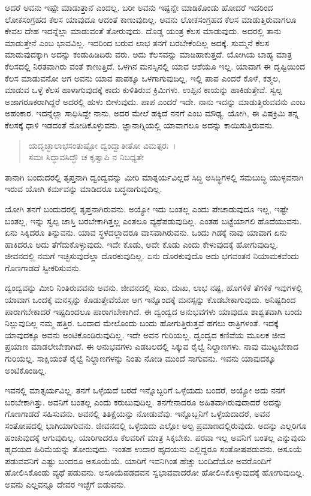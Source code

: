 ಆದರೆ ಅವನು ಇಷ್ಟೇ ಮಾಡುತ್ತಾನೆ ಎಂದಲ್ಲ. ಬರೀ ಅವನು ಇಷ್ಟನ್ನೇ ಮಾಡಿಕೊಂಡು ಹೋದರೆ ಇದರಿಂದ ಲೋಕಸಂಗ್ರಹದ ಕೆಲಸ ಯಾವುದೂ ಆದಂತೆ ಕಾಣುವುದಿಲ್ಲ. ಅವನು ಲೋಕಸಂಗ್ರಹದ ಕೆಲಸ ಮಾಡುತ್ತಿರುವಾಗಲೂ ಕೇವಲ ದೇಹ ಇದನ್ನೆಲ್ಲಾ ಮಾಡುವಂತೆ ತೋರುವುದು. ದೊಡ್ಡ ಯಂತ್ರ ಕೆಲಸ ಮಾಡುವುದು. ಅದರಲ್ಲಿ ತಾನು ಮಾಡುತ್ತೇನೆ ಎಂಬ ಭಾವವಿಲ್ಲ. ಇದರಿಂದ ಬರುವ ಲಾಭ ತನಗೆ ಬರಬೇಕೆಂದಿಲ್ಲ ಅದಕ್ಕೆ. ಸುಮ್ಮನೆ ಕೆಲಸ ಮಾಡುವುದಕ್ಕಾಗಿ ಅದನ್ನು ಕಂಡುಹಿಡಿದಿರು ವರು. ಅದು ಕೆಲಸವನ್ನು ಮಾಡಿಹಾಕುತ್ತದೆ. ಯೋಗಿಯ ಬಾಹ್ಯ ಮಾತ್ರ ಕೆಲಸದಲ್ಲಿ ನಿರತವಾಗಿರು ವಂತೆ ಕಾಣುತ್ತಿದೆ. ಒಳಗಿನ ಮನಸ್ಸಿನಲ್ಲಿ ಯಾವ ಆಶೆಯೂ ಇಲ್ಲ. ಯಾವಾಗ ಈ ದೃಷ್ಟಿಯಿಂದ ಕೆಲಸ ಮಾಡುವನೋ ಆಗ ಅವನು ಯಾವ ಪಾಪಕ್ಕೂ ಒಳಗಾಗುವುದಿಲ್ಲ. ಇಲ್ಲಿ ಪಾಪ ಎಂದರೆ ಕೊಳೆ, ಕಶ್ಮಲ, ಮಾಡುವ ಒಳ್ಳೆ ಕೆಲಸ ಹಾಳಾಗುವುದಕ್ಕೆ ಕಾದು ಕುಳಿತಿರುವ ಕ್ರಿಮಿಗಳು. ಉಪ್ಪಿನ ಕಾಯನ್ನು ಹಾಕಿಡುತ್ತೇವೆ. ಸ್ವಲ್ಪ ಅಜಾಗರೂಕರಾಗಿದ್ದರೆ ಅದರಲ್ಲಿ ಹುಳು ಬೀಳುವುದು. ಪಾಪ ಎಂದರೆ ಇದೇ. ನಾನು ಇದನ್ನು ಮಾಡುತ್ತಿರುವವನು ಎಂಬ ಅಹಂಕಾರ. ಇದನ್ನೆಲ್ಲಾ ಸಾಧಿಸಿದ್ದೇ ನಾನು, ಅದರ ಮೇಲೆ ಹಕ್ಕಿದೆ ನನಗೆ ಎಂಬ ಮೌಢ್ಯ. ಯೋಗಿ, ಈ ವಿಷಕ್ರಿಮಿ ತನ್ನ ಕೆಲಸಕ್ಕೆ ಧಾಳಿ ಇಡದಂತೆ ನೋಡಿಕೊಳ್ಳುವನು. ಜ್ಞಾನಾಗ್ನಿಯಲ್ಲಿ ಯಾವಾಗಲೂ ಅದನ್ನು ಕಾಯಿಸುತ್ತಿರುವನು.

\begin{verse}
ಯದೃಚ್ಛಾಲಾಭಸಂತುಷ್ಟೋ ದ್ವಂದ್ವಾತೀತೋ ವಿಮತ್ಸರಃ~।\\ಸಮಃ ಸಿದ್ಧಾವಸಿದ್ಧೌ ಚ ಕೃತ್ವಾಪಿ ನ ನಿಬಧ್ಯತೇ 
\end{verse}

{\small ತಾನಾಗಿ ಬಂದುದರಲ್ಲಿ ತೃಪ್ತನಾಗಿ ದ್ವಂದ್ವವನ್ನು ಮೀರಿ ಮಾತ್ಸರ್ಯವಿಲ್ಲದೆ ಸಿದ್ಧಿ ಅಸಿದ್ಧಿಗಳಲ್ಲಿ ಸಮಬುದ್ಧಿ ಯುಳ್ಳವನಾಗಿ ಇರುವ ಯೋಗಿ ಕರ್ಮವನ್ನು ಮಾಡಿದರೂ ಬದ್ಧನಾಗುವುದಿಲ್ಲ.}

ಯೋಗಿ ತನಗೆ ಬಂದುದರಲ್ಲಿ ತೃಪ್ತನಾಗಿರುವನು. ಅಯ್ಯೋ ಇದು ಬಂತಲ್ಲ ಎಂದು ಪೇಚಾಡುವುದೂ ಇಲ್ಲ, ಇಷ್ಟೇ ಬಂತಲ್ಲ, ಇನ್ನು ಸ್ವಲ್ಪ ಜಾಸ್ತಿ ಬರಬೇಕಾಗಿತ್ತಲ್ಲ ಎಂತಲೂ ವ್ಯಥೆಪಡುವುದಿಲ್ಲ. ಎಂತಹ ಬಟ್ಟೆಯಾಗಲಿ ಹೊದೆಯುವನು. ಏನು ಸಿಕ್ಕಿದರೂ ತಿನ್ನುವನು. ಯಾವ ಸ್ಥಳದಲ್ಲಾದರೂ ವಾಸವಾಗಿರುವನು. ಒಂದು ಗಿಡಕ್ಕೆ ನಾವು ಯಾವಾಗ ಏನು ಹಾಕಿದರೂ ಅದು ತೆಗೆದುಕೊಳ್ಳುವುದು. ಇದೇ ಕೊಡು, ಅದೇ ಕೊಡು ಎಂದು ಕೇಳುವುದಕ್ಕೆ ಹೋಗುವುದಿಲ್ಲ. ಜೀವನದಲ್ಲಿ ನಮಗೆ ಇಚ್ಛಿಸುವುದೆಲ್ಲಾ ದೊರಕುವುದಿಲ್ಲ. ಏನು ದೊರಕುವುದೊ ಅದು ಭಗವಂತನ ನಿಯಾಮಕವೆಂದು ಗೊಣಗಾಡದೆ ಸ್ವೀಕರಿಸುವನು.

ದ್ವಂದ್ವವನ್ನು ಮೀರಿ ನಿಂತಿರುವವನು ಅವನು. ಜೀವನದಲ್ಲಿ ಸುಖ, ದುಃಖ, ಲಾಭ ನಷ್ಟ, ಹೊಗಳಿಕೆ ತೆಗಳಿಕೆ ಇವುಗಳಲ್ಲಿ ಯಾವಾಗ ಒಂದಕ್ಕೆ ಮನಸ್ಸನ್ನು ಕೊಡುತ್ತೇವೆಯೋ ಆಗ ಇನ್ನೊಂದಕ್ಕೆ ಮನಸ್ಸನ್ನು ಕೊಡಬೇಕಾಗುವುದು. ಅನಿಷ್ಟದಿಂದ ಪಾರಾಗಬೇಕಾದರೆ ಇಷ್ಟದಿಂದಲೂ ಪಾರಾಗಬೇಕಾಗಿದೆ. ಈ ದ್ವಂದ್ವದ ಅನುಭವಗಳು ಯಾವುದೂ ಶಾಶ್ವತವಾಗಿ ಬಂದು ನಿಲ್ಲುವುದಿಲ್ಲ ನಮ್ಮ ಹತ್ತಿರ. ಒಂದಾದ ಮೇಲೊಂದು ಬಂದು ಹೋಗುತ್ತಿರುತ್ತವೆ ಹಗಲು ರಾತ್ರಿಗಳಂತೆ. ಇದಕ್ಕೆ ಯಾವುದಕ್ಕೂ ಅವನು ಅಂಟಿಕೊಂಡಿರುವುದಿಲ್ಲ. ಇದೇ ಅವನ ಗುರಿಯಲ್ಲ. ದ್ವಂದ್ವದ ಕಣಿವೆಯ ಮೂಲಕ ಜೀವ ಪ್ರಯಾಣ ಮಾಡಲೇಬೇಕಾಗಿದೆ. ಈ ಅನುಭವಗಳು ಎಡಬಲದಲ್ಲಿ ಸಿಕ್ಕುವ ರೈಲ್ವೆ ನಿಲ್ದಾಣಗಳು. ನಾವು ಮುಟ್ಟಬೇಕಾದ ಗುರಿಯಲ್ಲ. ಸಾಕ್ಷಿಯಂತೆ ರೈಲ್ವೆ ನಿಲ್ದಾಣಗಳನ್ನು ನಿಂತು ನೋಡಿ ಮುಂದೆ ಸಾಗುವನು. ಇವನು ಯಾವುದಕ್ಕೂ ಅಂಟಿಕೊಂಡಿಲ್ಲ.

ಇವನಲ್ಲಿ ಮಾತ್ಸರ್ಯವಿಲ್ಲ. ತನಗೆ ಒಳ್ಳೆಯದೆ ಬರದೆ ಇನ್ನೊಬ್ಬರಿಗೆ ಒಳ್ಳೆಯದು ಬಂದರೆ, ಅಯ್ಯೋ ಅದು ನನಗೆ ಬರಬೇಕಾಗಿತ್ತು. ಅವನಿಗೆ ಬಂತಲ್ಲ ಎಂದು ಕರುಬುವುದಿಲ್ಲ. ತನಗೇನಾದರೂ ಅಹಿತವಾಗಿರುವುದಾದರೆ ಅದನ್ನು ಗೊಣಗಾಡದೆ ಸಹಿಸುವನು. ಅವನಲ್ಲಿ ತಿತಿಕ್ಷೆಯನ್ನು ನೋಡುವೆವು. ಇನ್ನೊಬ್ಬನಿಗೆ ಒಳ್ಳೆಯದಾದರೆ, ಅವನ ಸಂತೋಷದಲ್ಲಿ ಭಾಗಿಯಾಗುವನು. ಜೀವನದಲ್ಲಿ ಒಳ್ಳೆಯದು ಎಲ್ಲೋ ಅಲ್ಪ ಪ್ರಮಾಣದಲ್ಲಿರುವುದು. ಅದನ್ನು ಎಲ್ಲರಿಗೂ ಹಂಚುವುದಕ್ಕೆ ಆಗುವುದಿಲ್ಲ. ಯಾರಿಗಾದರೂ ಕೆಲವರಿಗೆ ಮಾತ್ರ ಸಿಕ್ಕಬೇಕು. ಪರವಾ ಇಲ್ಲ ಅವನಿಗೆ ಬಂತಲ್ಲ ಎನ್ನುವುದು ಹೃದಯದ ಹಿರಿಮೆಯನ್ನು ತೋರುವುದು. ಇಂತಹ ಉದಾರ ಹೃದಯನು ಎಲ್ಲಿದ್ದರೂ ಸಂತೋಷಪಡುವನು. ಅಸೂಯೆ ಪಡುವವನಿಗೆ ಎಷ್ಟು ಬಂದರೂ ಅಸೂಯೆಯೆ. ಯಾರಿಗೆ ಇವನಿಗಿಂತ ಹೆಚ್ಚು ಬಂದಿದೆಯೋ ಅವರೊಂದಿಗೆ ಹೋಲಿಸಿಕೊಂಡು ವ್ಯಥೆ ಪಡುವನು. ಅಸೂಯೆಪಡದವನ ಸ್ವಭಾವವಾದರೋ ಹೋಲಿಸಿಕೊಳ್ಳುವುದಕ್ಕೆ ಹೋಗುವುದಿಲ್ಲ. ಅವನು ಎಲ್ಲವನ್ನೂ ದೇವರ ಇಚ್ಛೆಗೆ ಬಿಡುವನು.

